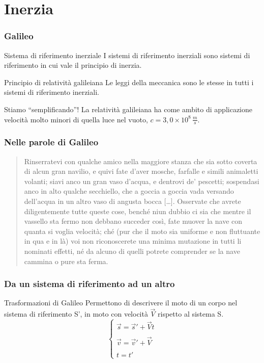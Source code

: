 \documentclass[]{beamer}
\theoremstyle{plain}
\begin{document}
\section{Inerzia}


\begin{frame}
  \frametitle{Galileo}
\begin{block}{Sistema di riferimento inerziale}
I sistemi di riferimento inerziali sono sistemi di riferimento in cui vale il principio di inerzia.
\end{block}\pause
\begin{block}{Principio di relatività galileiana}
Le leggi della meccanica sono le stesse in tutti i sistemi di riferimento inerziali.
\end{block}\pause
\begin{alertblock}{Stiamo ``semplificando''!}
La relatività galileiana ha come ambito di applicazione velocità molto minori di quella luce nel vuoto, $ c = 3,0 \times 10^8 \, \frac{m}{s} $.
\end{alertblock}
\end{frame}

\begin{frame}
  \frametitle{Nelle parole di Galileo}
  \begin{quote}
    Rinserratevi con qualche amico nella maggiore stanza che sia sotto coverta di alcun gran navilio, e quivi fate d’aver mosche, farfalle e simili animaletti volanti; siavi anco un gran vaso d’acqua, e dentrovi de’ pescetti; sospendasi anco in alto qualche secchiello, che a goccia a goccia vada versando dell’acqua in un altro vaso di angusta bocca [\ldots]. Osservate che avrete diligentemente tutte queste cose, benché niun dubbio ci sia che mentre il vassello sta fermo non debbano succeder così, fate muover la nave con quanta si voglia velocità; ché (pur che il moto sia uniforme e non fluttuante in qua e in là) voi non riconoscerete una minima mutazione in tutti li nominati effetti, né da alcuno di quelli potrete comprender se la nave cammina o pure sta ferma.
  \end{quote}
\end{frame}


\begin{frame}
  \frametitle{Da un sistema di riferimento ad un altro}
  \begin{block}{Trasformazioni di Galileo}
Permettono di descrivere il moto di un corpo nel sistema di riferimento S', in moto con velocità $\vec{V}$ rispetto al sistema S.\pause
\[ \left\{ 
  \begin{array}{l}
  \vec{s} = \vec{s}' + \vec{V}t\\
  \,\\
  \vec{v} = \vec{v}' + \vec{V}\\
  \,\\
  t = t'
  \end{array}
  \right.  \]
\end{block}
\end{frame}
\end{document}

